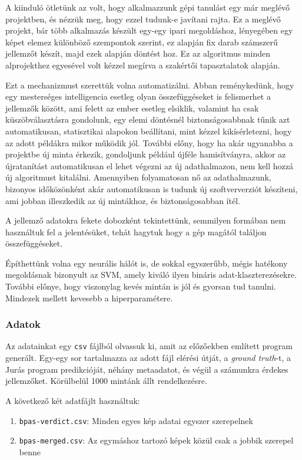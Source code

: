 A kiinduló ötletünk az volt, hogy alkalmazzunk gépi tanulást egy már meglévő projektben,
és nézzük meg, hogy ezzel tudunk-e javítani rajta. Ez a meglévő projekt, bár több 
alkalmazás készült egy-egy ipari megoldáshoz, lényegében egy képet elemez 
különböző szempontok szerint, ez alapján fix darab számszerű jellemzőt készít, 
majd ezek alapján döntést hoz. Ez az algoritmus minden alprojekthez egyesével
volt kézzel megírva a szakértői tapasztalatok alapján. 

Ezt a mechanizmust szerettük volna automatizálni. Abban reménykedünk, hogy egy 
mesterséges intelligencia esetleg olyan összefüggéseket is felismerhet a jellemzők
között, ami felett az ember esetleg elsiklik, valamint ha csak küszöbválasztásra
gondolunk, egy elemi döntésnél biztonságosabbnak tűnik azt automatikusan, statisztikai
alapokon beállítani, mint kézzel kikísérletezni, hogy az adott példákra mikor működik jól.
További előny, hogy ha akár ugyanabba a projektbe új minta érkezik, gondoljunk például újféle 
hamisítványra, akkor az újratanítást automatikusan el lehet végezni az új adathalmazon,
nem kell hozzá új algoritmust kitalálni. Amennyiben folyamatosan nő az adathalmazunk, 
bizonyos időközönként akár automatikusan is tudunk új szoftververziót készíteni,
ami jobban illeszkedik az új mintákhoz, és biztonságosabban ítél.


A jellemző adatokra fekete dobozként tekintettünk, semmilyen formában nem használtuk fel
a jelentésüket, tehát hagytuk hogy a gép magától találjon összefüggéseket.


Építhettünk volna egy neurális hálót is, de sokkal egyszerűbb, mégis hatékony
megoldásnak bizonyult az SVM, amely kiváló ilyen bináris adat-klaszterezésekre.
További előnye, hogy viszonylag kevés mintán is jól és gyorsan tud tanulni.
Mindezek mellett kevesebb a hiperparamétere.


\subsubsection{Adatok}
\label{sec:adatok}

Az adatainkat egy \texttt{csv} fájlból olvassuk ki, amit az előzőekben említett program 
generált. Egy-egy sor tartalmazza az adott fájl elérési útját, a \textit{ground truth}-t,
a Jurás program predikcióját, néhány metaadatot, és végül a számunkra érdekes jellemzőket.
Körülbelül 1000 mintánk állt rendelkezésre.

\noindent
A következő két adatfájlt használtuk:

\begin{enumerate}
\item
	\texttt{bpas-verdict.csv}: Minden egyes kép adatai egyszer szerepelnek
\item
	\texttt{bpas-merged.csv}: Az egymáshoz tartozó képek közül csak a jobbik szerepel benne
\end{enumerate}

